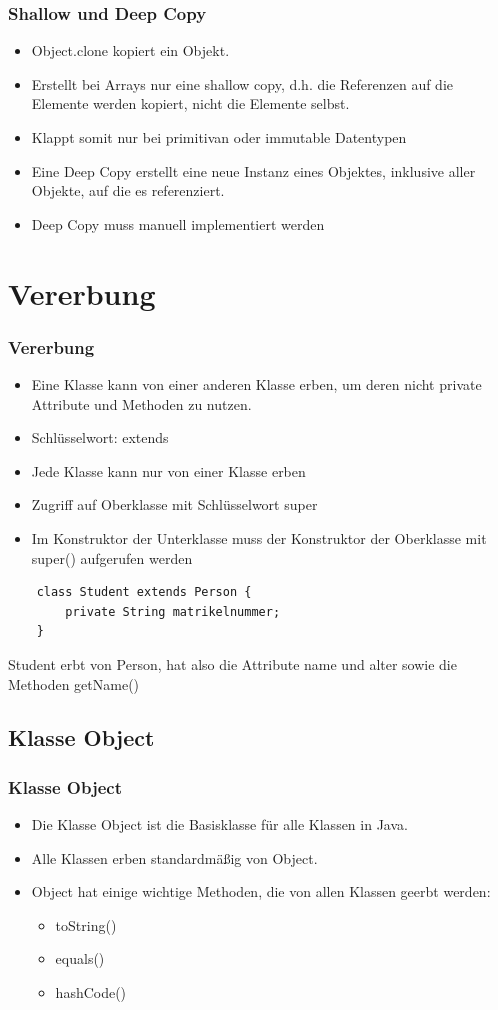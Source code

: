 \begin{frame}[fragile]
\frametitle{Shallow und Deep Copy}
\begin{itemize}
    \item Object.clone kopiert ein Objekt.
    \item Erstellt bei Arrays nur eine shallow copy, d.h. die Referenzen auf die Elemente werden kopiert, nicht die Elemente selbst.
    \item Klappt somit nur bei primitivan oder immutable Datentypen
    \item Eine Deep Copy erstellt eine neue Instanz eines Objektes, inklusive aller Objekte, auf die es referenziert.
    \item Deep Copy muss manuell implementiert werden
\end{itemize}

\end{frame}

\section{Vererbung}

\begin{frame}[fragile]
\frametitle{Vererbung}
\begin{itemize}
\item Eine Klasse kann von einer anderen Klasse erben, um deren nicht private Attribute und Methoden zu nutzen. 
\item Schlüsselwort: extends
\item Jede Klasse kann nur von einer Klasse erben
\item Zugriff auf Oberklasse mit Schlüsselwort super
\item Im Konstruktor der Unterklasse muss der Konstruktor der Oberklasse mit super() aufgerufen werden
\end{itemize}
\begin{lstlisting}
    class Student extends Person {
        private String matrikelnummer;
    }
\end{lstlisting}
Student erbt von Person, hat also die Attribute name und alter sowie die Methoden getName()
\end{frame}

\subsection{Klasse Object}
\begin{frame}[fragile]
\frametitle{Klasse Object}
\begin{itemize}
\item Die Klasse Object ist die Basisklasse für alle Klassen in Java. 
\item Alle Klassen erben standardmäßig von Object.
\item Object hat einige wichtige Methoden, die von allen Klassen geerbt werden: 
\begin{itemize}
\item toString()
\item equals()
\item hashCode()
\end{itemize}
\end{itemize}
\end{frame}

